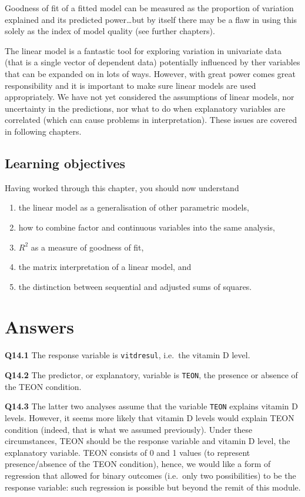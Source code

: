 \documentclass[
  oneside]{krantz}
\providecommand{\tightlist}{%
  \setlength{\itemsep}{0pt}\setlength{\parskip}{0pt}}
\begin{document}
Goodness of fit of a fitted model can be measured as the proportion of variation explained and its predicted power\ldots but by itself there may be a flaw in using this solely as the index of model quality (see further chapters).

The linear model is a fantastic tool for exploring variation in univariate data (that is a single vector of dependent data) potentially influenced by ther variables that can be expanded on in lots of ways. However, with great power comes great responsibility and it is important to make sure linear models are used appropriately. We have not yet considered the assumptions of linear models, nor uncertainty in the predictions, nor what to do when explanatory variables are correlated (which can cause problems in interpretation). These issues are covered in following chapters.

\hypertarget{learning-objectives-2}{%
\subsection{Learning objectives}\label{learning-objectives-2}}

Having worked through this chapter, you should now understand

\begin{enumerate}
\def\labelenumi{\arabic{enumi}.}
\tightlist
\item
  the linear model as a generalisation of other parametric models,
\item
  how to combine factor and continuous variables into the same analysis,
\item
  \(R^2\) as a measure of goodness of fit,
\item
  the matrix interpretation of a linear model, and
\item
  the distinction between sequential and adjusted sums of squares.
\end{enumerate}

\hypertarget{ANSlm}{%
\section{Answers}\label{ANSlm}}

\textbf{Q14.1} The response variable is \texttt{vitdresul}, i.e.~the vitamin D level.

\textbf{Q14.2} The predictor, or explanatory, variable is \texttt{TEON}, the presence or absence of the TEON condition.

\textbf{Q14.3} The latter two analyses assume that the variable \texttt{TEON} explains vitamin D levels. However, it seems more likely that vitamin D levels would explain TEON condition (indeed, that is what we assumed previously). Under these circumstances, TEON should be the response variable and vitamin D level, the explanatory variable. TEON consists of 0 and 1 values (to represent presence/absence of the TEON condition), hence, we would like a form of regression that allowed for binary outcomes (i.e.~only two possibilities) to be the response variable: such regression is possible but beyond the remit of this module.
\end{document}
